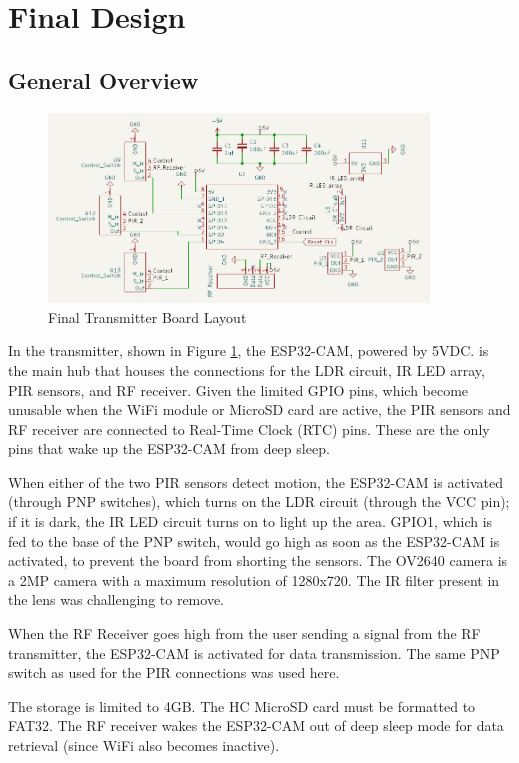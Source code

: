 \documentclass[class=report,11pt,crop=false]{standalone}
\begin{document}
\section{Final Design}\label{sc: HW_FD}

\subsection{General Overview}
\begin{figure}[h]
\centering
\includegraphics[width=0.9\textwidth]{Images/Transmitter_layout.png}
\caption{Final Transmitter Board Layout}
\label{fig:T_Schem}
\end{figure}

In the transmitter, shown in Figure \ref{fig:T_Schem}, the ESP32-CAM, powered by 5VDC. is the main hub that houses the connections for the LDR circuit, IR LED array, PIR sensors, and RF receiver. 
Given the limited GPIO pins, which become unusable when the WiFi module or MicroSD card are active, the PIR sensors and RF receiver are connected to Real-Time Clock (RTC) pins. These are the only pins that wake up the ESP32-CAM from deep sleep. 

When either of the two PIR sensors detect motion, the ESP32-CAM is activated (through PNP switches), which turns on the LDR circuit (through the VCC pin); if it is dark, the IR LED circuit turns on to light up the area. GPIO1, which is fed to the base of the PNP switch, would go high as soon as the ESP32-CAM is activated, to prevent the board from shorting the sensors. The OV2640 camera is a 2MP camera with a maximum resolution of 1280x720. The IR filter present in the lens was challenging to remove. 

When the RF Receiver goes high from the user sending a signal from the RF transmitter, the ESP32-CAM is activated for data transmission. The same PNP switch as used for the PIR connections was used here. 

The storage is limited to 4GB. The HC MicroSD card must be formatted to FAT32. The RF receiver wakes the ESP32-CAM out of deep sleep mode for data retrieval (since WiFi also becomes inactive). 
\end{document}
